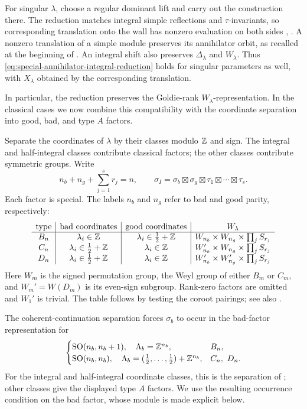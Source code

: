 For singular $\lambda$, choose a regular dominant lift and carry out
the construction there. The reduction matches integral simple
reflections and $\tau$-invariants, so corresponding translation onto
the wall has nonzero evaluation on both sides
\cite[Lem.~12.6]{Vogan1982}, \cite[Lem.~4.7]{BMSZ22}.
A nonzero translation of a simple module preserves its annihilator
orbit, as recalled at the beginning of \cite[\S5]{BMSZ22}.
An integral shift also preserves $\Delta_\lambda$ and $W_\lambda$.
Thus \eqref{eq:special-annihilator-integral-reduction} holds for
singular parameters as well, with $X_\lambda$ obtained by the
corresponding translation.

In particular, the reduction preserves the Goldie-rank
$W_\lambda$-representation. In the classical cases we now combine
this compatibility with the coordinate separation into good, bad,
and type $A$ factors.

Separate the coordinates of $\lambda$ by their classes modulo $\mathbb{Z}$
and sign. The integral and half-integral classes contribute classical
factors; the other classes contribute symmetric groups. Write
\[
  n_b+n_g+\sum_{j=1}^s r_j=n,\qquad
  \sigma_I=\sigma_b\boxtimes\sigma_g
              \boxtimes\tau_1\boxtimes\cdots\boxtimes\tau_s.
\]
Each factor is special. The labels $n_b$ and $n_g$ refer to bad and good
parity, respectively:
\[
\begin{array}{c|c|c|c}
  \text{type}&\text{bad coordinates}&\text{good coordinates}&W_\lambda\\ \hline
  B_n&\lambda_i\in\mathbb{Z}&\lambda_i\in\frac12+\mathbb{Z}
       &W_{n_b}\times W_{n_g}\times\prod_j S_{r_j}\\
  C_n&\lambda_i\in\frac12+\mathbb{Z}&\lambda_i\in\mathbb{Z}
       &W_{n_b}'\times W_{n_g}\times\prod_j S_{r_j}\\
  D_n&\lambda_i\in\frac12+\mathbb{Z}&\lambda_i\in\mathbb{Z}
       &W_{n_b}'\times W_{n_g}'\times\prod_j S_{r_j}
\end{array}
\]
Here $W_m$ is the signed permutation group, the Weyl group of either
$B_m$ or $C_m$, and $W_m'=W(D_m)$ is its even-sign subgroup. Rank-zero
factors are omitted and $W_1'$ is trivial. The table follows by testing
the coroot pairings; see also \cite[\S2.3 and \S\S6--7]{BMW2024}.

The coherent-continuation separation forces $\sigma_b$ to occur in
the bad-factor representation for
\[
  \begin{cases}
    \SO(n_b,n_b+1),\quad\Lambda_b=\BZ^{n_b},&B_n,\\
    \SO(n_b,n_b),\quad\Lambda_b=(\frac12,\ldots,\frac12)+\BZ^{n_b},&C_n,\ D_n.
  \end{cases}
\]
For the integral and half-integral coordinate classes, this is the
separation of \cite[\S6, especially Cor.~6.15]{BMSZ22}; other classes
give the displayed type $A$ factors. We use the resulting occurrence
condition on the bad factor, whose module is made explicit below.

